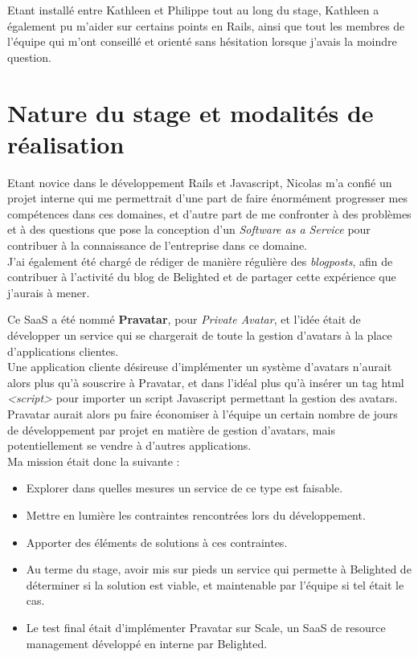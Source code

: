 \documentclass{report}
\begin{document}
  Etant installé entre Kathleen et Philippe tout au long du stage, Kathleen a également pu m'aider sur certains points en Rails, ainsi que tout les membres de l'équipe qui m'ont conseillé et orienté sans
  hésitation lorsque j'avais la moindre question.\\


\chapter{Nature du stage et modalités de réalisation}

  Etant novice dans le développement Rails et Javascript, Nicolas m'a confié un projet interne qui me permettrait d'une part de faire énormément progresser mes compétences dans ces domaines, et
  d'autre part de me confronter à des problèmes et à des questions que pose la conception d'un \textit{Software as a Service} pour contribuer à la connaissance de l'entreprise dans ce domaine.\\
  J'ai également été chargé de rédiger de manière régulière des \textit{blogposts}, afin de contribuer à l'activité du blog de Belighted et de partager cette expérience que j'aurais à mener.

  Ce SaaS a été nommé \textbf{Pravatar}, pour \textit{Private Avatar}, et l'idée était de développer un service qui se chargerait de toute la gestion d'avatars à la place d'applications clientes.\\
  Une application cliente désireuse d'implémenter un système d'avatars n'aurait alors plus qu'à souscrire à Pravatar, et dans l'idéal plus qu'à insérer un tag html \textit{<script>} pour importer un script
  Javascript permettant la gestion des avatars.\\
  Pravatar aurait alors pu faire économiser à l'équipe un certain nombre de jours de développement par projet en matière de gestion d'avatars, mais potentiellement se vendre à d'autres applications.\\

  Ma mission était donc la suivante : \\

  \begin{itemize}
    \item Explorer dans quelles mesures un service de ce type est faisable.
    \item Mettre en lumière les contraintes rencontrées lors du développement.
    \item Apporter des éléments de solutions à ces contraintes.
    \item Au terme du stage, avoir mis sur pieds un service qui permette à Belighted de déterminer si la solution est viable, et maintenable par l'équipe si tel était le cas.
    \item Le test final était d'implémenter Pravatar sur Scale, un SaaS de resource management développé en interne par Belighted.\\
  \end{itemize}
\end{document}
